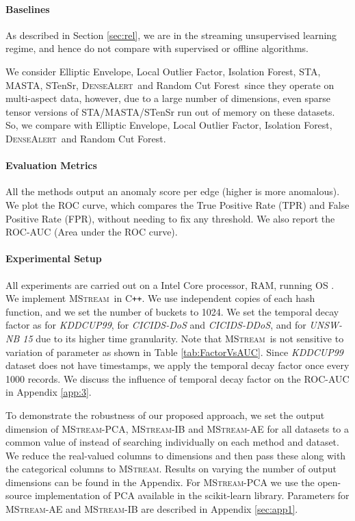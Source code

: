 \documentclass[sigconf]{acmart}
\newcommand{\method}{\textsc{MStream}}
\newcommand{\densealert}{\textsc{DenseAlert}}
\newcommand{\rcf}{Random Cut Forest}
\newcommand{\iso}{Isolation Forest}
\newcommand{\elliptic}{Elliptic Envelope}
\newcommand{\lof}{Local Outlier Factor}
\begin{document}
\paragraph{\bf Baselines}
As described in Section \ref{sec:rel}, we are in the streaming unsupervised learning regime, and hence do not compare with supervised or offline algorithms.

We consider \elliptic, \lof, \iso, STA, MASTA, STenSr, \densealert\ and \rcf\ since they operate on multi-aspect data, however, due to a large number of dimensions, even sparse tensor versions of STA/MASTA/STenSr run out of memory on these datasets. So, we compare with \elliptic, \lof, \iso, \densealert\ and \rcf.

\paragraph{\bf Evaluation Metrics}
All the methods output an anomaly score per edge (higher is more anomalous). We plot the ROC curve, which compares the True Positive Rate (TPR) and False Positive Rate (FPR), without needing to fix any threshold. We also report the ROC-AUC (Area under the ROC curve).


\paragraph{\bf Experimental Setup}
All experiments are carried out on a  Intel Core  processor,  RAM, running OS  . We implement \method\ in C\texttt{++}. We use  independent copies of each hash function, and we set the number of buckets to 1024. We set the temporal decay factor  as  for \emph{KDDCUP99},  for \emph{CICIDS-DoS} and \emph{CICIDS-DDoS}, and  for \emph{UNSW-NB 15} due to its higher time granularity. Note that \method\ is not sensitive to variation of  parameter as shown in Table \ref{tab:FactorVsAUC}. Since \emph{KDDCUP99} dataset does not have timestamps, we apply the temporal decay factor once every 1000 records. We discuss the influence of temporal decay factor  on the ROC-AUC in Appendix \ref{app:3}.

To demonstrate the robustness of our proposed approach, we set the output dimension of \method-PCA, \method-IB and \method-AE for all datasets to a common value of  instead of searching individually on each method and dataset. We reduce the real-valued columns to  dimensions and then pass these along with the categorical columns to \method. Results on varying the number of output dimensions can be found in the Appendix. For \method-PCA we use the open-source implementation of PCA available in the scikit-learn \cite{scikit-learn} library. Parameters for \method-AE and \method-IB are described in Appendix \ref{sec:app1}.
\end{document}
